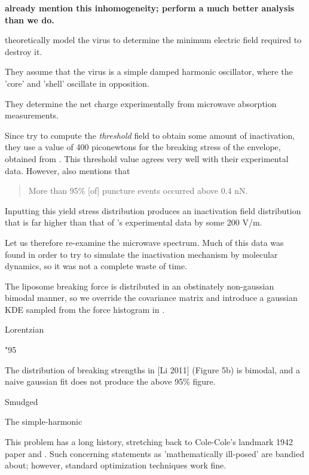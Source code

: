 \documentclass[paper.tex]{subfiles}
\begin{document}
	
\begin{center}
	{\bf \cite{Microwave2009} already mention this inhomogeneity; \cite{Elastic} perform a much better analysis than we do.}
\end{center}
	

\cite{Efficient2015} theoretically model the virus to determine the minimum electric field required to destroy it. 

They assume that the virus is a simple damped harmonic oscillator, where the 'core' and 'shell' oscillate in opposition. 

They determine the net charge experimentally from microwave absorption measurements.



Since \cite{Efficient2015} try to compute the {\it threshold} field to obtain some amount of inactivation, they use a value of 400 piconewtons for the breaking stress of the envelope, obtained from \cite{Bending2011}. This threshold value agrees very well with their experimental data. However, \cite{Bending2011} also mentions that 

\begin{quote}
	More than 95\% [of] puncture events occurred above 0.4 nN.
\end{quote}

Inputting this yield stress distribution produces an inactivation field distribution that is far higher than that of \cite{Efficient2015}'s experimental data by some 200 V/m.

Let us therefore re-examine the microwave spectrum. Much of this data was found in order to try to simulate the inactivation mechanism by molecular dynamics, so it was not a complete waste of time.

The liposome breaking force is distributed in an obstinately non-gaussian bimodal manner, so we override the covariance matrix and introduce a gaussian KDE sampled from the force histogram in \cite{Bending2011}.

Lorentzian


"95%

The distribution of breaking strengths in [Li 2011] (Figure 5b) is bimodal, and a naive gaussian fit does not produce the above 95\% figure.

Smudged 

The simple-harmonic

This problem has a long history, stretching back to Cole-Cole's landmark 1942\cite{Dispersion1941} paper and \cite{Electrical1941}. Such concerning statements as 'mathematically ill-posed' are bandied about; however, standard optimization techniques work fine.
\end{document}
